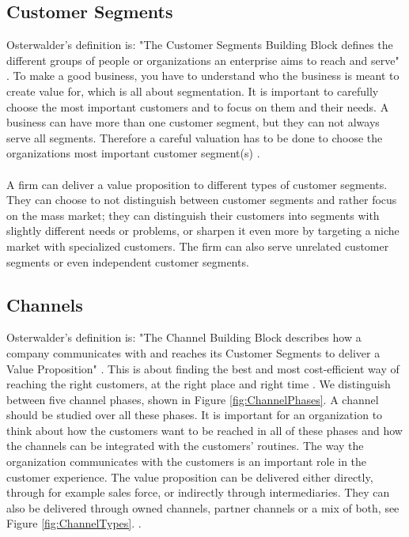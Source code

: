 \subsection{Customer Segments}
Osterwalder's definition is: "The Customer Segments Building Block defines the different groups of people or organizations an enterprise aims to reach and serve" \cite{osterwalder}. To make a good business, you have to understand who the business is meant to create value for, which is all about segmentation. It is important to carefully choose the most important customers and to focus on them and their needs. A business can have more than one customer segment, but they can not always serve all segments. Therefore a careful valuation has to be done to choose the organizations most important customer segment(s) \cite{osterwalder} \cite{osterwalderthesis}. \\ \\
A firm can deliver a value proposition to different types of customer segments. They can choose to not distinguish between customer segments and rather focus on the mass market; they can distinguish their customers into segments with slightly different needs or problems, or sharpen it even more by targeting a niche market with specialized customers. The firm can also serve unrelated customer segments or even independent customer segments. \cite{osterwalder}

\subsection{Channels}
Osterwalder's definition is: "The Channel Building Block describes how a company communicates with and reaches its Customer Segments to deliver a Value Proposition" \cite{osterwalder}. This is about finding the best and most cost-efficient way of reaching the right customers, at the right place and right time \cite{osterwalderthesis}. We distinguish between five channel phases, shown in Figure \ref{fig:ChannelPhases}. A channel should be studied over all these phases. It is important for an organization to think about how the customers want to be reached in all of these phases and how the channels can be integrated with the customers' routines. The way the organization communicates with the customers is an important role in the customer experience. The value proposition can be delivered either directly, through for example sales force, or indirectly through intermediaries. They can also be delivered through owned channels, partner channels or a mix of both, see Figure  \ref{fig:ChannelTypes}.
 \cite{osterwalderthesis}. \\ \\

